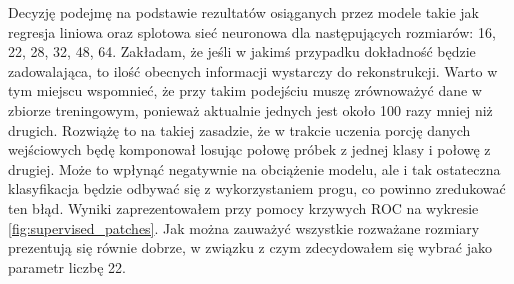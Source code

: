 Decyzję podejmę na podstawie rezultatów osiąganych przez modele takie jak regresja liniowa oraz splotowa sieć neuronowa dla następujących rozmiarów: 16, 22, 28, 32, 48, 64. Zakładam, że jeśli w jakimś przypadku dokładność będzie zadowalająca, to ilość obecnych informacji wystarczy do rekonstrukcji. Warto w tym miejscu wspomnieć, że przy takim podejściu muszę zrównoważyć dane w zbiorze treningowym, ponieważ aktualnie jednych jest około 100 razy mniej niż drugich. Rozwiążę to na takiej zasadzie, że w trakcie uczenia porcję danych wejściowych będę komponował losując połowę próbek z jednej klasy i połowę z drugiej. Może to wpłynąć negatywnie na obciążenie modelu, ale i tak ostateczna klasyfikacja będzie odbywać się z wykorzystaniem progu, co powinno zredukować ten błąd. Wyniki zaprezentowałem przy pomocy krzywych ROC na wykresie \ref{fig:supervised_patches}. Jak można zauważyć wszystkie rozważane rozmiary prezentują się równie dobrze, w związku z czym zdecydowałem się wybrać jako parametr liczbę 22.

